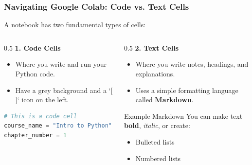 \documentclass{beamer}
\begin{document}
\begin{frame}[fragile]
    \frametitle{Navigating Google Colab: Code vs. Text Cells}
    
    A notebook has two fundamental types of cells:
    
    \begin{columns}[T] %
        \begin{column}{0.5\textwidth}
            \textbf{1. Code Cells}
            \begin{itemize}
                \item Where you write and run your Python code.
                \item Have a grey background and a `[ ]` icon on the left.
            \end{itemize}
            \begin{lstlisting}[language=Python]
# This is a code cell
course_name = "Intro to Python"
chapter_number = 1
            \end{lstlisting}
        \end{column}
        
        \begin{column}{0.5\textwidth}
            \textbf{2. Text Cells}
            \begin{itemize}
                \item Where you write notes, headings, and explanations.
                \item Uses a simple formatting language called \textbf{Markdown}.
            \end{itemize}
            \begin{block}{Example Markdown}
            You can make text \textbf{bold}, \textit{italic}, or create:
            \begin{itemize}
                \item Bulleted lists
                \item Numbered lists
            \end{itemize}
            \end{block}
        \end{column}
    \end{columns}
    
\end{frame}
\end{document}
